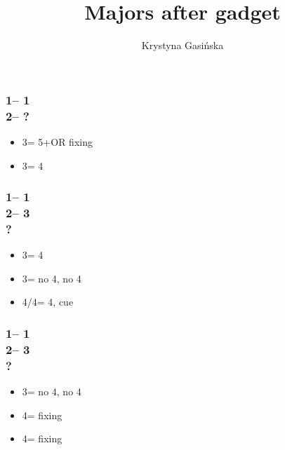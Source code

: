 \documentclass[12pt, a4paper]{article}
\title{Majors after gadget}
\author{Krystyna Gasińska}
\begin{document}
\maketitle


\subsubsection*{1\minor -- 1\hearts \\ 2\nt -- ?}
\begin{itemize}
    \item 3\hearts = 5+\spades OR fixing \hearts
    \item 3\spades = 4\spades
\end{itemize}

\subsubsection*{1\minor -- 1\hearts \\ 2\nt -- 3\hearts \\ ?}
\begin{itemize}
    \item 3\spades  = 4\spades
    \item 3\nt = no 4\spades, no 4\hearts
    \item 4\clubs/4\diams = 4\hearts, cue
\end{itemize}

\subsubsection*{1\minor -- 1\hearts \\ 2\nt -- 3\spades \\ ?}
\begin{itemize}
    \item 3\nt = no 4\spades, no 4\hearts
    \item 4\clubs = fixing \hearts
    \item 4\diams = fixing \spades
\end{itemize}

\end{document}
